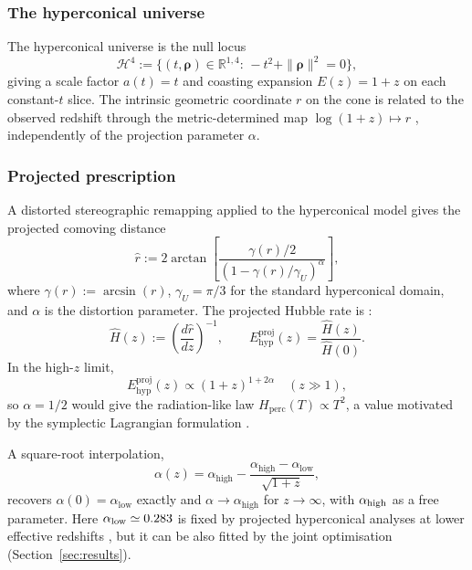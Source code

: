﻿\documentclass[3p,twocolumn]{elsarticle}
\renewcommand{\vec}[1]{\boldsymbol{#1}}
\begin{document}
\subsubsection{The hyperconical universe}

The hyperconical universe is the null locus
\begin{equation}
\label{eq:hyperconical}
\mathcal{H}^4:=\bigl\{(t,\vec\rho)\in\mathbb{R}^{1,4}:\,-t^2+\|\vec\rho\|^2=0\bigr\},
\end{equation}
giving a scale factor $a(t)=t$ and coasting expansion $E(z)=1+z$ on each constant-$t$ slice. The intrinsic geometric coordinate $r$ on the cone is related to the observed redshift through the metric-determined map $\log(1+z)\mapsto r$ \cite{monjo2017hyperconical}, independently of the projection parameter $\alpha$.

\subsubsection{Projected prescription}\label{sec:proj}

A distorted stereographic remapping \cite{monjo2018projected} applied to the hyperconical model gives the projected comoving distance
\begin{equation}
\hat r :=
2\arctan\!\left[
\frac{\gamma(r)/2}{\left(1-\gamma(r)/\gamma_U\right)^\alpha}
\right],
\end{equation}
where $\gamma(r):=\arcsin(r)$, $\gamma_U=\pi/3$ for the standard hyperconical domain, and $\alpha$ is the distortion parameter. The projected Hubble rate is \cite{monjo2017hyperconical}:
\begin{equation}
\hat H(z):=\left(\frac{d\hat r}{dz}\right)^{-1},
\qquad
E_{\mathrm{hyp}}^{\mathrm{proj}}(z)=\frac{\hat H(z)}{\hat H(0)}.
\end{equation}
In the high-$z$ limit,
\begin{equation}
E_{\mathrm{hyp}}^{\mathrm{proj}}(z)\propto (1+z)^{1+2\alpha}\quad(z\gg1),
\end{equation}
so $\alpha=1/2$ would give the radiation-like law $H_{\mathrm{perc}}(T)\propto T^2$, a value motivated by the symplectic Lagrangian formulation \cite{monjo2023hubble, monjo2020lagrangian}.

A square-root interpolation,
\begin{equation}
\label{eq:running_sqrt}
\alpha(z)=\alpha_{\mathrm{high}}-\frac{\alpha_{\mathrm{high}}-\alpha_{\mathrm{low}}}{\sqrt{1+z}},
\end{equation}
recovers $\alpha(0)=\alpha_{\mathrm{low}}$ exactly and $\alpha\to\alpha_{\mathrm{high}}$ for $z\to\infty$, with $\alpha_{\rm high}$ as a free parameter. Here $\alpha_{\rm low}\simeq0.283$ is fixed by projected hyperconical analyses at lower effective redshifts \cite{monjo2017hyperconical, monjo2018projected, Monjo_2024}, but it can be also fitted by the joint optimisation (Section~\ref{sec:results}). 
\end{document}
